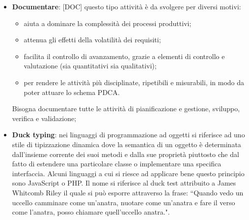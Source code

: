 \begin{itemize}
	\item \textbf{Documentare}: [DOC] questo tipo attività è da svolgere per diversi motivi:
		\begin{itemize}
			\item aiuta a dominare la complessità dei processi produttivi;
			\item attenua gli effetti della volatilità dei requisiti;
			\item facilita il controllo di avanzamento, grazie a elementi di controllo e valutazione (sia quantitativi sia qualitativi);
			\item per rendere le attività più disciplinate, ripetibili e misurabili, in modo da poter attuare lo schema PDCA.
		\end{itemize}
		\noindent
		Bisogna documentare tutte le attività di pianificazione e gestione, sviluppo, verifica e validazione;


	\item \textbf{Duck typing}: nei linguaggi di programmazione ad oggetti si riferisce ad uno stile di tipizzazione dinamica dove la semantica di un oggetto è determinata dall'insieme corrente dei suoi metodi e dalla sue proprietà piuttosto che dal fatto di estendere una particolare classe o implementare una specifica interfaccia. \newline
Alcuni linguaggi a cui si riesce ad applicare bene questo principio sono JavaScript o PHP.
Il nome si riferisce al duck test attribuito a James Whitcomb Riley il quale si può esporre attraverso la frase: ``Quando vedo un uccello camminare come un'anatra, nuotare come un'anatra e fare il verso come l'anatra, posso chiamare quell'uccello anatra.".

\end{itemize}
